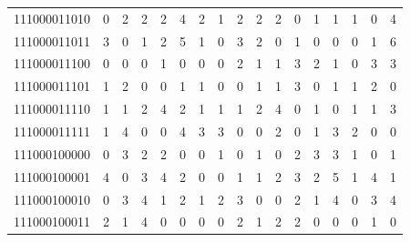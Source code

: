 \documentclass[10pt,a4paper]{article}
\begin{document}
\begin{longtable}{ |c|c|c|c|c|c|c|c|c|c|c|c|c|c|c|c|c| }
    111000011010              & 0                            & 2                                & 2                            & 2                              & 4   & 2   & 1   & 2   & 2   & 2   & 0   & 1   & 1   & 1   & 0   & 4   \\
    111000011011              & 3                            & 0                                & 1                            & 2                              & 5   & 1   & 0   & 3   & 2   & 0   & 1   & 0   & 0   & 0   & 1   & 6   \\
    111000011100              & 0                            & 0                                & 0                            & 1                              & 0   & 0   & 0   & 2   & 1   & 1   & 3   & 2   & 1   & 0   & 3   & 3   \\
    111000011101              & 1                            & 2                                & 0                            & 0                              & 1   & 1   & 0   & 0   & 1   & 1   & 3   & 0   & 1   & 1   & 2   & 0   \\
    111000011110              & 1                            & 1                                & 2                            & 4                              & 2   & 1   & 1   & 1   & 2   & 4   & 0   & 1   & 0   & 1   & 1   & 3   \\
    111000011111              & 1                            & 4                                & 0                            & 0                              & 4   & 3   & 3   & 0   & 0   & 2   & 0   & 1   & 3   & 2   & 0   & 0   \\
    111000100000              & 0                            & 3                                & 2                            & 2                              & 0   & 0   & 1   & 0   & 1   & 0   & 2   & 3   & 3   & 1   & 0   & 1   \\
    111000100001              & 4                            & 0                                & 3                            & 4                              & 2   & 0   & 0   & 1   & 1   & 2   & 3   & 2   & 5   & 1   & 4   & 1   \\
    111000100010              & 0                            & 3                                & 4                            & 1                              & 2   & 1   & 2   & 3   & 0   & 0   & 2   & 1   & 4   & 0   & 3   & 4   \\
    111000100011              & 2                            & 1                                & 4                            & 0                              & 0   & 0   & 0   & 2   & 1   & 2   & 2   & 0   & 0   & 0   & 1   & 0   \\

\end{longtable}
\end{document}
